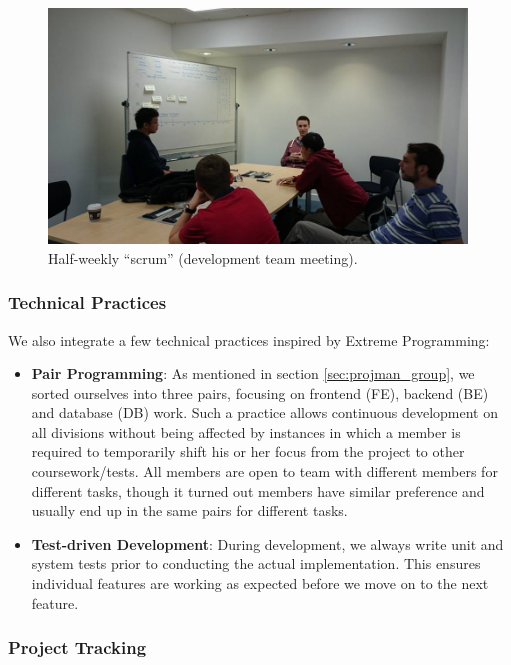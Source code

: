 \documentclass[a4paper, titlepage]{article}
\begin{document}
\begin{figure}[ht]
  \centering
    \includegraphics[width = 0.99\textwidth, trim= 0 0 0 3cm, clip]{./projman/scrum.jpg}
  \caption{Half-weekly ``scrum'' (development team meeting).}
  \label{fig:projman_scrum}
\end{figure}

\subsubsection{Technical Practices}

We also integrate a few technical practices inspired by Extreme Programming:
\begin{itemize}
  \item \textbf{Pair Programming}: As mentioned in section \ref{sec:projman_group}, we sorted
        ourselves into three pairs, focusing on frontend (FE), backend (BE) and database (DB) work.
        Such a practice allows continuous development on all divisions without
        being affected by instances in which a member is required to temporarily shift his or her
        focus from the project to other coursework/tests. All members are open to team
        with different members for different tasks, though it turned out members have similar
        preference and usually end up in the same pairs for different tasks.
  \item \textbf{Test-driven Development}: During development, we always write unit and system tests prior to conducting the actual implementation. This ensures individual features are working as expected before we move on to the next feature.

\end{itemize} 

\subsubsection{Project Tracking} \label{sec:projman_tracking}
\end{document}
